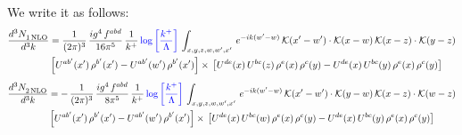\documentclass[9pt]{article}
\numberwithin{equation}{section}
\begin{document}
We write it as follows: 
\begin{align}
   \frac{d^{3}N_{1\,\rm NLO}^{\rm}}{d^{3}k}  & = \frac{1}{(2\pi)^{3}}\,\frac{ig^{4}\,f^{abd}}{16\pi^{5}}\,\frac{1}{k^{+}}\,{\color{blue}\log{\left[\frac{k^{+}}{\Lambda}\right]}}\,\int_{x,y,z,w,w',x'}\,e^{-ik(w^\prime-w)}\, \mathcal{K}(x'-w')\cdot \mathcal{K}(x-w)\, \mathcal{K}(x-z)\cdot \mathcal{K}(y-z) \notag \\ & \left[U^{ab'}(x')\,\rho^{b'}(x')-U^{ab'}(w')\, \rho^{b'}(x')\right]\times\, \left[U^{de}(x)\,U^{bc}(z)\, \rho^{e}(x)\,\rho^{c}(y)-U^{de}(x)\,U^{bc}(y)\,\rho^{e}(x)\,\rho^{c}(y)\right]
\end{align}
\begin{align}
   \frac{d^{3}N_{2\,\rm NLO}^{\rm}}{d^{3}k}  & = -\,\frac{1}{(2\pi)^{3}}\, \frac{ig^{4}\, f^{abd}}{8\pi^{5}}\, \frac{1}{k^{+}}\,{\color{blue}\log{\left[\frac{k^{+}}{\Lambda}\right]}}\,\int_{x,y,z,w,w',x'}\,e^{-ik(w^\prime-w)}\, \mathcal{K}(x'-w')\cdot \mathcal{K}(y-w)\, \mathcal{K}(x-z)\cdot \mathcal{K}(w-z) \notag \\ & \left[U^{ab'}(x')\,\rho^{b'}(x')-U^{ab'}(w')\, \rho^{b'}(x')\right]\times\,\left[U^{de}(x)\,U^{bc}(w)\, \rho^{e}(x)\,\rho^{c}(y)-U^{de}(x)\,U^{bc}(y)\,\rho^{e}(x)\,\rho^{c}(y)\right] 
\end{align}
\end{document}

